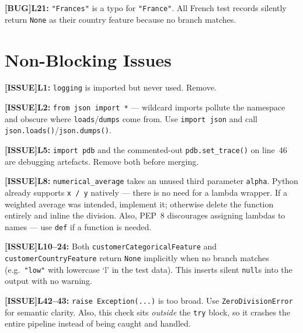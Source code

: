 \documentclass{article}
\newcommand{\lineno}[1]{\textbf{L#1:} }
\newcommand{\linesno}[2]{\textbf{L#1--#2:} }
\newcommand{\bug}{\textcolor{red!70!black}{\textbf{[BUG]}}\space}
\newcommand{\issue}{\textcolor{orange!80!black}{\textbf{[ISSUE]}}\space}
\begin{document}
\begin{bugbox}
\bug \lineno{21} \texttt{"Frances"} is a typo for \texttt{"France"}. All French test records silently return \texttt{None} as their country feature because no branch matches.
\end{bugbox}

\section{Non-Blocking Issues}

\begin{issuebox}
\issue \lineno{1} \texttt{logging} is imported but never used. Remove.
\end{issuebox}

\begin{issuebox}
\issue \lineno{2} \texttt{from json import *} --- wildcard imports pollute the namespace and obscure where \texttt{loads}/\texttt{dumps} come from. Use \texttt{import json} and call \texttt{json.loads()}/\texttt{json.dumps()}.
\end{issuebox}

\begin{issuebox}
\issue \lineno{5} \texttt{import pdb} and the commented-out \texttt{pdb.set\_trace()} on line~46 are debugging artefacts. Remove both before merging.
\end{issuebox}

\begin{issuebox}
\issue \lineno{8} \texttt{numerical\_average} takes an unused third parameter \texttt{alpha}. Python already supports \texttt{x / y} natively --- there is no need for a lambda wrapper. If a weighted average was intended, implement it; otherwise delete the function entirely and inline the division. Also, PEP~8 discourages assigning lambdas to names --- use \texttt{def} if a function is needed.
\end{issuebox}

\begin{issuebox}
\issue \linesno{10}{24} Both \texttt{customerCategoricalFeature} and \texttt{customerCountryFeature} return \texttt{None} implicitly when no branch matches (e.g.\ \texttt{"low"} with lowercase `l' in the test data). This inserts silent \texttt{null}s into the output with no warning.
\end{issuebox}

\begin{issuebox}
\issue \linesno{42}{43} \texttt{raise Exception(...)} is too broad. Use \texttt{ZeroDivisionError} for semantic clarity. Also, this check sits \emph{outside} the \texttt{try} block, so it crashes the entire pipeline instead of being caught and handled.
\end{issuebox}
\end{document}
